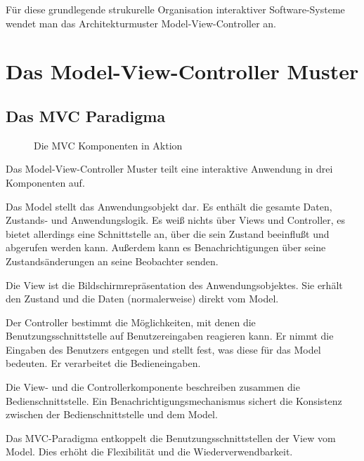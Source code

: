 \documentclass[11pt,a4paper,titlepage]{scrreprt}
\begin{document}
Für diese grundlegende strukurelle Organisation interaktiver Software-Systeme wendet man
das Architekturmuster Model-View-Controller an.

\chapter{Das Model-View-Controller Muster}
\section{Das MVC Paradigma}
\begin{figure}[h]
\caption{Die MVC Komponenten in Aktion}
\end{figure}
Das Model-View-Controller Muster teilt eine interaktive Anwendung in drei Komponenten auf.

Das Model stellt das Anwendungsobjekt dar. Es enthält die gesamte Daten, Zustands-
und Anwendungslogik. Es weiß nichts über Views und Controller, es bietet allerdings eine
Schnittstelle an, über die sein Zustand beeinflußt und abgerufen werden kann. Außerdem
kann es Benachrichtigungen über seine Zustandsänderungen an seine Beobachter senden.

Die View ist die Bildschirmrepräsentation des Anwendungsobjektes. Sie erhält den Zustand
und die Daten (normalerweise) direkt vom Model.

Der Controller bestimmt die Möglichkeiten, mit denen die Benutzungsschnittstelle auf
Benutzereingaben reagieren kann. Er nimmt die Eingaben des Benutzers entgegen und stellt
fest, was diese für das Model bedeuten. Er verarbeitet die Bedieneingaben.

Die View- und die Controllerkomponente beschreiben zusammen die Bedienschnittstelle.
Ein Benachrichtigungsmechanismus sichert die Konsistenz zwischen der Bedienschnittstelle
und dem Model.

Das MVC-Paradigma entkoppelt die Benutzungsschnittstellen der View vom Model. Dies
erhöht die Flexibilität und die Wiederverwendbarkeit.
\end{document}
